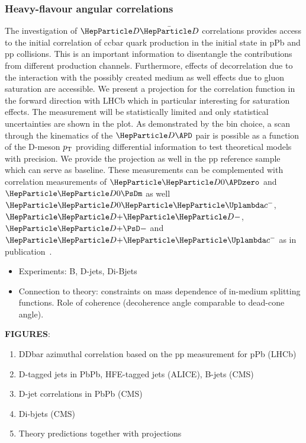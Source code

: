 \subsubsection{Heavy-flavour angular correlations}
The investigation of $\PD \bar{\PD}$ correlations provides access to the initial correlation of ccbar quark production in the initial state in pPb and pp collisions. This is an important information to disentangle the contributions from different production channels. Furthermore, effects of decorrelation due to the interaction with the possibly created medium as well effects due to gluon saturation are accessible. We present a projection for the correlation function in the forward direction with LHCb which in particular interesting for saturation effects. The measurement will be statistically limited and only statistical uncertainties are shown in the plot. As demonstrated by the bin choice, a scan through the kinematics of the $\PD \APD$ pair is possible as a function of the D-meson $p_{\rm T}$ providing differential information to test theoretical models with precision.  We provide the projection as well in the pp reference sample which can serve as baseline. These measurements can be complemented with correlation measurements of $\PDz \APDzero$  and $\PDz \PsDm$ as well $\PDz \PGLc^-$, $\PDp \PDm$, $\PDp\PsD-$ and $\PDp \PGLc^-$ as in publication~\cite{LHCb-PAPER-2012-003}.

\begin{itemize}
\item {Experiments:} B, D-jets, Di-Bjets
\item {Connection to theory:} constraints on mass dependence of in-medium splitting functions. Role of coherence (decoherence angle comparable to dead-cone angle).
\end{itemize}

\textbf{FIGURES}:
\begin{enumerate}
\item DDbar azimuthal correlation based on the pp measurement for pPb (LHCb)
\item D-tagged jets in PbPb, HFE-tagged jets (ALICE), B-jets (CMS)
\item D-jet correlations in PbPb (CMS)
\item Di-bjets (CMS)
\item Theory predictions together with projections
\end{enumerate}
